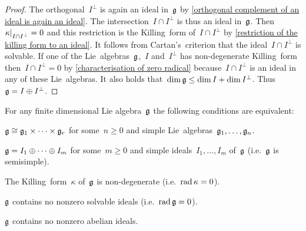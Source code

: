 \begin{proof}
  The orthogonal~$I^\perp$ is again an ideal in~$\mathfrak{g}$ by \cref{orthogonal complement of an ideal is again an ideal}.
  The intersection~$I \cap I^\perp$ is thus an ideal in~$\mathfrak{g}$.
  Then~$\restrict{\kappa}{I \cap I^\perp} = 0$ and this restriction is the Killing~form of~$I \cap I^\perp$ by \cref{restriction of the killing form to an ideal}.
  It follows from Cartan’s~criterion that the ideal~$I \cap I^\perp$ is solvable.
  If one of the Lie~algebras~$\mathfrak{g}$,~$I$ and~$I^\perp$ has non-degenerate Killing~form then~$I \cap I^\perp = 0$ by \cref{characterisation of zero radical} because~$I \cap I^\perp$ is an ideal in any of these Lie~algebras.
  It also holds that~$\dim \mathfrak{g} \leq \dim I + \dim I^\perp$.
  Thus~$\mathfrak{g} = I \oplus I^\perp$.
\end{proof}


\begin{theorem}
  \label{characterizations of fd semisimple lie algebras}
  For any finite dimensional Lie algebra~$\mathfrak{g}$ the following conditions are equivalent:
  \begin{equivalenceslist}
    \item
    \label{product of simple lie algebras general}
      $\mathfrak{g} \cong \mathfrak{g}_1 \times \dotsb \times \mathfrak{g}_r$ for some~$n \geq 0$ and simple Lie~algebras~$\mathfrak{g}_1, \dotsc, \mathfrak{g}_n$.
    \item
      \label{sum of simple ideals general}
      $\mathfrak{g} = I_1 \oplus \dotsb \oplus I_m$ for some~$m \geq 0$ and simple ideals~$I_1, \dotsc, I_m$ of~$\mathfrak{g}$ (i.e.~$\mathfrak{g}$ is semisimple).
    \item
      \label{killing form is nondegenerate general}
      The Killing~form~$\kappa$ of~$\mathfrak{g}$ is non-degenerate (i.e.~$\operatorname{rad} \kappa = 0$).
    \item
      \label{contains no solvable ideal general}
      $\mathfrak{g}$ contains no nonzero solvable ideals (i.e.~$\operatorname{rad} \mathfrak{g} = 0$).
    \item
      \label{contains no abelian ideal general}
      $\mathfrak{g}$ contains no nonzero abelian ideals.
  \end{equivalenceslist}
\end{theorem}


